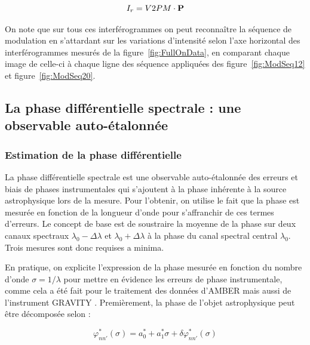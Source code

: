 \begin{equation}
    I_r = V2PM \cdot \text{\textbf{P}} \label{eq:FullOnFit}
\end{equation}

On note que sur tous ces interférogrammes on peut reconnaître la séquence de modulation en s'attardant sur les variations d'intensité selon l'axe horizontal des interférogrammes mesurés de la figure~\ref{fig:FullOnData}, en comparant chaque image de celle-ci à chaque ligne des séquence appliquées des figure~\ref{fig:ModSeq12} et figure~\ref{fig:ModSeq20}.


\subsection{La phase différentielle spectrale : une observable auto-étalonnée}
\label{sec:PhaseSpecDiff}

\subsubsection{Estimation de la phase différentielle}

La phase différentielle spectrale est une observable auto-étalonnée des erreurs et biais de phases instrumentales qui s'ajoutent à la phase inhérente à la source astrophysique lors de la mesure. Pour l'obtenir, on utilise le fait que la phase est mesurée en fonction de la longueur d'onde pour s'affranchir de ces termes d'erreurs. Le concept de base \citep{buscher2015} est de soustraire la moyenne de la phase sur deux canaux spectraux $\lambda_0 - \Delta\lambda$ et $\lambda_0 + \Delta\lambda$ à la phase du canal spectral central $\lambda_0$. Trois mesures sont donc requises a minima.

En pratique, on explicite l'expression de la phase mesurée en fonction du nombre d'onde $\sigma = 1 / \lambda$ pour mettre en évidence les erreurs de phase instrumentale, comme cela a été fait pour le traitement des données d'\ac{AMBER} \citep{millour2008} mais aussi de l'instrument \ac{GRAVITY} \citep{lapeyrere2014}. Premièrement, la phase de l'objet astrophysique peut être décomposée selon :

\begin{equation}
    \varphi^{*}_{nn'}(\sigma) = a^{*}_0 + a^{*}_1 \sigma + \delta\varphi^{*}_{nn'}(\sigma) \label{eq:PhaseSource}
\end{equation}

